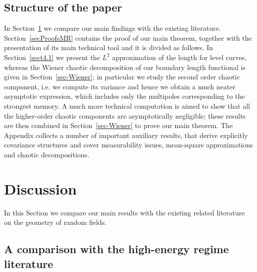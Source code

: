 \documentclass[10pt]{amsart}
\theoremstyle{definition}\newtheorem{defi}[theo]{Definition}\newtheorem{rema}[theo]{Remark}\newtheorem{exam}[theo]{Example}\newtheorem{exem}[theo]{Example}\newtheorem{nota}[theo]{Notation}
\begin{document}
\subsection{Structure of the paper}

In Section~\ref{sec-discussion} we compare our main findings with the existing literature. Section~\ref{secProofsMR} contains the proof of our main theorem, together with the presentation of its main technical tool and it is divided as follows. In Section~\ref{sect4.1} we present the $L^2$ approximation of the length for level curves, whereas the Wiener chaotic decomposition of our boundary length functional is given in Section~\ref{sec-Wiener}; in particular we study the second order chaotic component, i.e. we compute its variance and hence we obtain a much neater asymptotic expression, which includes only the multipoles corresponding to the strongest memory. A much more technical computation is aimed to show that all the higher-order chaotic components are asymptotically negligible; these results are then combined in Section~\ref{sec-Wiener} to prove our main theorem. The Appendix collects a number of important auxiliary results, that derive explicitly covariance structures and cover measurability issues, mean-square approximations and chaotic decompositions.



\section{Discussion}
\label{sec-discussion}

In this Section we compare our main results with the existing related literature on the geometry of random fields.

\subsection{A comparison with the high-energy regime literature}\label{secHigh}
\end{document}
